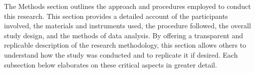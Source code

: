 The Methods section outlines the approach and procedures employed to conduct this research. This section provides a detailed account of the participants involved, the materials and instruments used, the procedure followed, the overall study design, and the methods of data analysis. By offering a transparent and replicable description of the research methodology, this section allows others to understand how the study was conducted and to replicate it if desired. Each subsection below elaborates on these critical aspects in greater detail.
